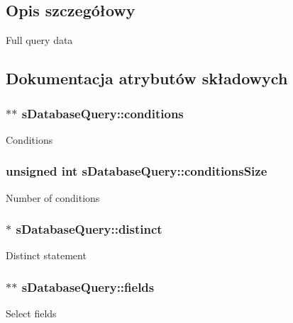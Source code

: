 \subsection{Opis szczegółowy}
Full query data 

\subsection{Dokumentacja atrybutów składowych}
\subsubsection[{\texorpdfstring{conditions}{conditions}}]{$\ast$$\ast$ s\+Database\+Query\+::conditions}\hypertarget{structsDatabaseQuery_a54e52c15ffef2b87e3b2c7a4d0ffc2f9}{}\label{structsDatabaseQuery_a54e52c15ffef2b87e3b2c7a4d0ffc2f9}
Conditions 
\subsubsection[{\texorpdfstring{conditions\+Size}{conditionsSize}}]{\setlength{\rightskip}{0pt plus 5cm}unsigned int s\+Database\+Query\+::conditions\+Size}\hypertarget{structsDatabaseQuery_a7534216a1d5ad726447b73b6eb4fdbc4}{}\label{structsDatabaseQuery_a7534216a1d5ad726447b73b6eb4fdbc4}
Number of conditions 
\subsubsection[{\texorpdfstring{distinct}{distinct}}]{$\ast$ s\+Database\+Query\+::distinct}\hypertarget{structsDatabaseQuery_af873390ab854ce4a34f704971d271521}{}\label{structsDatabaseQuery_af873390ab854ce4a34f704971d271521}
Distinct statement 
\subsubsection[{\texorpdfstring{fields}{fields}}]{$\ast$$\ast$ s\+Database\+Query\+::fields}\hypertarget{structsDatabaseQuery_a2075e002e2ecbf166d9fbcc6f9780701}{}\label{structsDatabaseQuery_a2075e002e2ecbf166d9fbcc6f9780701}
Select fields 
